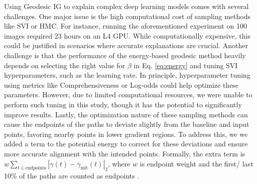 Using Geodesic IG to explain complex deep learning models comes with several challenges. One major issue is the high computational cost of sampling methods like SVI or HMC. For instance, running the aforementioned experiment on 100 images required 23 hours on an L4 GPU. While computationally expensive, this could be justified in scenarios where accurate explanations are crucial. Another challenge is that the performance of the energy-based geodesic method heavily depends on selecting the right value for $\beta$ in Eq. \ref{eq:energy}  and tuning SVI hyperparameters, such as the learning rate. In principle, hyperparameter tuning using metrics like Comprehensiveness or Log-odds could help optimize these parameters. However, due to limited computational resources, we were unable to perform such tuning in this study, though it has the potential to significantly improve results. Lastly, the optimization nature of these sampling methods can cause the endpoints of the paths to deviate slightly from the baseline and input points, favoring nearby points in lower gradient regions. To address this, we we added a term to the potential energy to correct for these deviations and ensure more accurate alignment with the intended points.  Formally, the extra term is $w \sum_{t \in \text{endpoints}} |\gamma(t) - \gamma_{\text{init}}(t)|_2$, where $w$ is endpoint weight and the first/ last 10\% of the paths are counted as endpoints .